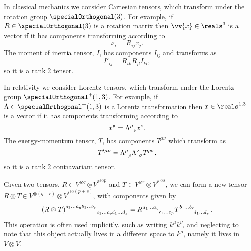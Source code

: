 \documentclass[fleqn]{NotesClass}
\newcommand{\dual}[1]{{#1^{*}}}
\newcommand{\lorentzGroup}{\specialOrthogonal^+(1, 3)}
\newcommand{\minkowskiSpace}{\reals^{1,3}}
\begin{document}
    \begin{exm}{}{}
        In classical mechanics we consider Cartesian tensors, which transform under the rotation group \(\specialOrthogonal(3)\).
        For example, if \(R \in \specialOrthogonal(3)\) is a rotation matrix then \(\vv{x} \in \reals^3\) is a vector if it has components transforming according to
        \begin{equation}
            x_i = R_{ij}x_j.
        \end{equation}
        The moment of inertia tensor, \(I\), has components \(I_{ij}\) and transforms as
        \begin{equation}
            I'_{ij} = R_{ik}R_{jl}I_{kl},
        \end{equation}
        so it is a rank 2 tensor.
        
        In relativity we consider Lorentz tensors, which transform under the Lorentz group \(\lorentzGroup\).
        For example, if \(\Lambda \in \lorentzGroup\) is a Lorentz transformation then \(x \in \minkowskiSpace\) is a vector if it has components transforming according to
        \begin{equation}
            x^\mu = \tensor{\Lambda}{^\mu_\nu}x^\nu.
        \end{equation}
        The energy-momentum tensor, \(T\), has components \(T^{\mu\nu}\) which transform as
        \begin{equation}
            T'^{\mu\nu} = \tensor{\Lambda}{^\mu_\rho}\tensor{\Lambda}{^\nu_\sigma} T^{\rho\sigma},
        \end{equation}
        so it is a rank 2 contravariant tensor.
    \end{exm}
    
    Given two tensors, \(R \in V^{\otimes q} \otimes \dual{V}^{\otimes p}\) and \(T \in V^{\otimes r} \otimes \dual{V}^{\otimes s}\), we can form a new tensor \(R \otimes T \in V^{\otimes(q + r)} \otimes \dual{V}^{\otimes(p + s)}\), with components given by
    \begin{equation}
        \tensor{(R \otimes T)}{^{a_1\dotso a_q b_1 \dotso b_r}_{c_1 \dotso c_p d_1 \dotso d_s}} = \tensor{R}{^{a_1\dotso a_q}_{c_1 \dotso c_p}} \tensor{T}{^{b_1 \dotso b_r}_{d_1 \dotso d_s}}.
    \end{equation}
    This operation is often used implicitly, such as writing \(k^\mu k^\nu\), and neglecting to note that this object actually lives in a different space to \(k^\mu\), namely it lives in \(V \otimes V\).
    
\end{document}
